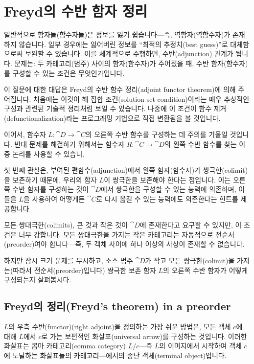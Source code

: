 \documentclass[DaoFP]{subfiles}
\begin{document}
\section{Freyd의 수반 함자 정리}

일반적으로 함자들(함수자들)은 정보를 잃기 쉽습니다---즉, 역함자(역함수자)가 존재하지 않습니다. 일부 경우에는 잃어버린 정보를 ``최적의 추정치(best guess)''로 대체함으로써 보완할 수 있습니다. 이를 체계적으로 수행하면, 수반(adjunction) 관계가 됩니다. 문제는: 두 카테고리(범주) 사이의 함자(함수자)가 주어졌을 때, 수반 함자(함수자)를 구성할 수 있는 조건은 무엇인가입니다.

이 질문에 대한 대답은 Freyd의 수반 함수 정리(adjoint functor theorem)에 의해 주어집니다. 처음에는 이것이 해 집합 조건(solution set condition)이라는 매우 추상적인 구성과 관련된 기술적 정리처럼 보일 수 있습니다. 나중에 이 조건이 함수 제거(defunctionalization)라는 프로그래밍 기법으로 직접 변환됨을 볼 것입니다.

이어서, 함수자 $L \colon \cat D \to \cat C$의 오른쪽 수반 함수를 구성하는 데 주의를 기울일 것입니다. 반대 문제를 해결하기 위해서는 함수자 $R \colon \cat C \to \cat D$의 왼쪽 수반 함수를 찾는 이중 논리를 사용할 수 있습니.

첫 번째 관찰은, 부여된 편함수(adjunction)에서 왼쪽 함자(함수자)가 쌍극한(colimit)을 보존하기 때문에, 우리의 함자 $L$이 쌍극한을 보존해야 한다는 점입니다. 이는 오른쪽 수반 함자를 구성하는 것이 $\cat D$에서 쌍극한을 구성할 수 있는 능력에 의존하며, 이들을 $L$을 사용하여 어떻게든 $\cat C$로 다시 옮길 수 있는 능력에도 의존한다는 힌트를 제공합니다.

모든 쌍대극한(colimits), 큰 것과 작은 것이 $\cat{D}$에 존재한다고 요구할 수 있지만, 이 조건은 너무 강합니다. 모든 쌍대극한을 가지는 작은 카테고리는 자동적으로 전순서(preorder)여야 합니다---즉, 두 객체 사이에 하나 이상의 사상이 존재할 수 없습니다.

하지만 잠시 크기 문제를 무시하고, 소스 범주 \(\cat D\)가 작고 모든 쌍극한(colimit)을 가지는(따라서 전순서(preorder)입니다) 쌍극한 보존 함자 \(L\)의 오른쪽 수반 함자가 어떻게 구성되는지 살펴봅시다.

\subsection{Freyd의 정리(Freyd's theorem) in a preorder}

$L$의 우측 수반(functor)(right adjoint)을 정의하는 가장 쉬운 방법은, 모든 객체 $c$에 대해 $L$에서 $c$로 가는 보편적인 화살표(universal arrow)를 구성하는 것입니다. 이러한 화살표는 콤마 카테고리(comma category) $L/c$—즉 $L$의 이미지에서 시작하여 객체 $c$에 도달하는 화살표들의 카테고리—에서의 종단 객체(terminal object)입니다.
\end{document}
